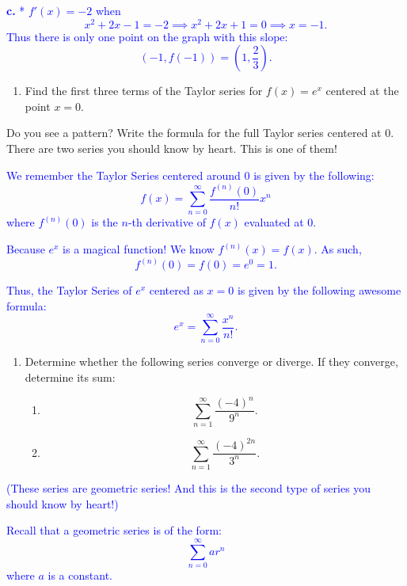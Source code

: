 \documentclass[
]{article}
\providecommand{\tightlist}{%
  \setlength{\itemsep}{0pt}\setlength{\parskip}{0pt}}
\begin{document}
\textcolor{blue}{\textbf{c.}
* $f'(x) = -2$ when
$$ x^2 + 2x - 1 = -2 \implies x^2 + 2x + 1 = 0 \implies x = -1.$$
Thus there is only one point on the graph with this slope:
$$(-1, f(-1)) = \left( 1,\frac{2}{3} \right).$$}

\hfill\break

\begin{enumerate}
\def\labelenumi{\arabic{enumi}.}
\setcounter{enumi}{3}
\tightlist
\item
  Find the first three terms of the Taylor series for \(f(x) = e^x\) centered at the point \(x = 0\).
\end{enumerate}

Do you see a pattern? Write the formula for the full Taylor series centered at 0. There are two series you should know by heart. This is one of them!

\textcolor{blue}{We remember the Taylor Series centered around 0 is given by the following:
$$f(x) = \sum_{n = 0}^{\infty} \frac{f^{(n)}(0)}{n!} x^n$$
where $f^{(n)}(0)$ is the $n$-th derivative of $f(x)$ evaluated at $0$.}

\textcolor{blue}{Because $e^x$ is a magical function! We know $f^{(n)}(x) = f(x)$. As such, $$f^{(n)}(0) = f(0) = e^0 = 1.$$}

\textcolor{blue}{
Thus, the Taylor Series of $e^x$ centered as $x = 0$ is given by the following awesome formula:
$$e^{x} = \sum_{n = 0}^{\infty} \frac{x^n}{n!}.$$}

\hfill\break

\begin{enumerate}
\def\labelenumi{\arabic{enumi}.}
\setcounter{enumi}{4}
\item
  Determine whether the following series converge or diverge. If they converge, determine its sum:

  \begin{enumerate}
  \def\labelenumii{\alph{enumii}.}
  \tightlist
  \item
    \[\sum_{n = 1}^{\infty} \frac{(-4)^n}{9^n}.\]
  \item
    \[\sum_{n = 1}^{\infty} \frac{(-4)^{2n}}{3^n}.\]
  \end{enumerate}
\end{enumerate}

\textcolor{blue}{(These series are geometric series! And this is the second type of series you should know by heart!)}

\textcolor{blue}{Recall that a geometric series is of the form:
$$\sum_{n = 0}^{\infty} a r^n$$
where $a$ is a constant.}
\end{document}
